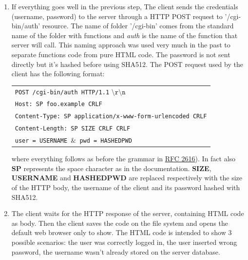 \begin{enumerate}
\item{If everything goes well in the previous step, The client sends the credentials (username, password) to the server through a HTTP POST request to '/cgi-bin/auth' resource. The name of folder '/cgi-bin' comes from the standard name of the folder with functions and \textit{auth} is the name of the function that server will call. This naming approach was used very much in the past to separate functions code from pure HTML code. The password is not sent directly but it's hashed before using SHA512. The POST request used by the client has the following format:\\
\begin{table}[H]
\hspace{2cm}\centering\footnotesize
\begin{tabular}{|l|}
\hline
\texttt{POST /cgi-bin/auth HTTP/1.1} $\mathtt{\setminus r\setminus n}$\\
\texttt{Host: SP foo.example CRLF}\\
\texttt{Content-Type: SP application/x-www-form-urlencoded CRLF}\\
\texttt{Content-Length: SP SIZE CRLF CRLF}\\
\texttt{user = USERNAME $\mathtt{\&}$ pwd = HASHEDPWD}\\
\hline
\end{tabular}
\end{table}
where everything follows as before the grammar in \href{https://tools.ietf.org/html/rfc2616}{RFC 2616}). In fact also \textbf{SP} represents the space character as in the documentation. \textbf{SIZE}, \textbf{USERNAME} and \textbf{HASHEDPWD} are replaced respectively with the size of the HTTP body, the username of the client and its password hashed with SHA512.
}
\item{The client waits for the HTTP response of the server, containing HTML code as body. Then the client saves the code on the file system and opens the default web browser only to show. The HTML code is intended to show 3 possible scenarios: the user was correctly logged in, the user inserted wrong password, the username wasn't already stored on the server database.}
\end{enumerate}

